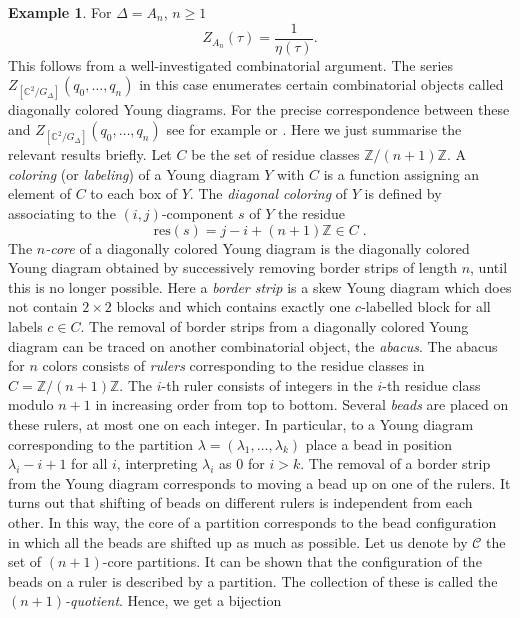 \documentclass[11pt,a4paper]{amsart}
\theoremstyle{definition}
\newtheorem{example}[theorem]{Example}
\newcommand{\SZ}{\mathbb{Z}}                    %
\newcommand{\SC}{\mathbb{C}}                    %
\begin{document}
\begin{example} 
	\label{ex:anlocaleta}	
	For $\Delta=A_n$, $n \geq 1$
	\[ Z_{A_n}(\tau)= \frac{1}{\eta(\tau)}.  \]
	This follows from a well-investigated combinatorial argument. The series $Z_{[\SC^2/G_\Delta]}(q_0,\dots,q_n)$ in this case enumerates certain combinatorial objects called diagonally colored Young diagrams. For the precise correspondence between these and $Z_{[\SC^2/G_\Delta]}(q_0,\dots,q_n)$ see for example \cite{fujii2017combinatorial} or \cite{gyenge2017enumeration}. Here we just summarise the relevant results briefly. Let $C$ be the set of residue classes $\SZ/(n+1)\SZ$. A \emph{coloring} (or \emph{labeling}) of a Young diagram $Y$ with $C$ is a function assigning an element of $C$ to each box of $Y$. The \emph{diagonal coloring} of $Y$ is defined by associating to the $(i,j)$-component $s$ of $Y$ the residue
	\[ \mathrm{res}(s)=j-i+(n+1)\SZ \in C\;.\]
	The \emph{$n$-core} of a diagonally colored Young diagram is the diagonally colored Young diagram obtained by successively removing border strips of length $n$, until this is no longer possible. Here a {\em border strip} is a skew Young diagram which does not contain $2 \times 2$ blocks and 
	which contains exactly one $c$-labelled block for all labels $c \in C$. The removal of border strips from a diagonally colored Young diagram can be traced on another combinatorial object, the \emph{abacus}. The abacus for $n$ colors consists of \emph{rulers} corresponding to the residue classes in $C=\SZ/(n+1)\SZ$.  The $i$-th ruler consists of integers in the $i$-th residue class modulo $n+1$ in increasing order from top to bottom. Several \emph{beads} are placed on these rulers, at most one on each integer. %
	In particular, to a Young diagram corresponding to the partition $\lambda=(\lambda_1,\dots,\lambda_k)$ place a bead in position $\lambda_i-i+1$ for all $i$, interpreting $\lambda_i$ as 0 for $i>k$. 
	The removal of a border strip from the Young diagram corresponds to moving a bead up on one of the rulers. It turns out that shifting of beads on different rulers is independent from each other. In this way, the core of a partition corresponds to the bead configuration in which all the beads are shifted up as much as possible. Let us denote by $\mathcal{C}$ the set of $(n+1)$-core partitions. %
	It can be shown that the configuration of the beads on a ruler is described by a partition. The collection of these is called the \emph{$(n+1)$-quotient}. Hence, we get a bijection

\end{example}
\end{document}
